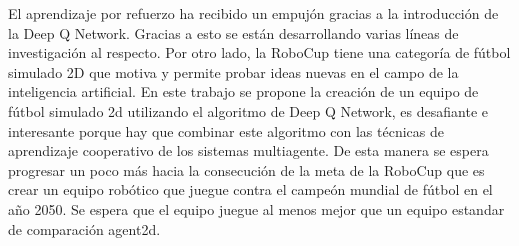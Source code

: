 \begin{resumen}
El aprendizaje por refuerzo ha recibido un empujón gracias a la introducción de la Deep Q Network. Gracias a esto se están desarrollando varias líneas de investigación al respecto. Por otro lado, la RoboCup tiene una categoría de fútbol simulado 2D que motiva y permite probar ideas nuevas en el campo de la inteligencia artificial. En este trabajo se propone la creación de un equipo de fútbol simulado 2d utilizando el algoritmo de Deep Q Network, es desafiante e interesante porque hay que combinar este algoritmo con las técnicas de aprendizaje cooperativo de los sistemas multiagente. De esta manera se espera progresar un poco más hacia la consecución de la meta de la RoboCup que es crear un equipo robótico que juegue contra el campeón mundial de fútbol en el año 2050. Se espera que el equipo juegue al menos mejor que un equipo estandar de comparación agent2d.
\end{resumen}
